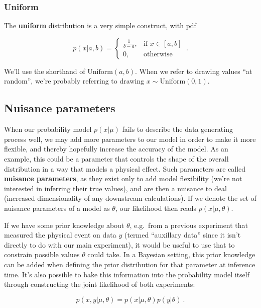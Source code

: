 \documentclass[
  11pt,
  numbers=noendperiod]{book}
\begin{document}
\hypertarget{uniform}{%
\subsubsection*{Uniform}\label{uniform}}

The \textbf{uniform} distribution is a very simple construct, with pdf

\[
    p(x | a, b) =
\begin{cases}
    \frac{1}{b-a},& \text{if } x\in [a,b]\\
    0,              & \text{otherwise}
\end{cases}
~.
\]

We'll use the shorthand of \(\mathrm{Uniform}(a,b)\). When we refer to
drawing values ``at random'', we're probably referring to drawing
\(x\sim \mathrm{Uniform}(0,1)\).

\hypertarget{sec-nps}{%
\subsection{Nuisance parameters}\label{sec-nps}}

When our probability model \(p(x|\mu)\) fails to describe the data
generating process well, we may add more parameters to our model in
order to make it more flexible, and thereby hopefully increase the
accuracy of the model. As an example, this could be a parameter that
controls the shape of the overall distribution in a way that models a
physical effect. Such parameters are called \textbf{nuisance
parameters}, as they exist only to add model flexibility (we're not
interested in inferring their true values), and are then a nuisance to
deal (increased dimensionality of any downstream calculations). If we
denote the set of nuisance parameters of a model as \(\theta\), our
likelihood then reads \(p(x|\mu,\theta)\).

If we have some prior knowledge about \(\theta\), e.g.~from a previous
experiment that measured the physical event on data \(y\) (termed
``auxillary data'' since it isn't directly to do with our main
experiment), it would be useful to use that to constrain possible values
\(\theta\) could take. In a Bayesian setting, this prior knowledge can
be added when defining the prior distribution for that parameter at
inference time. It's also possible to bake this information into the
probability model itself through constructing the joint likelihood of
both experiments:

\[p(x, y|\mu,\theta) = p(x|\mu,\theta)p(y|\theta) ~.\]
\end{document}
